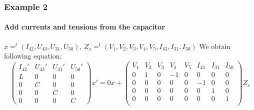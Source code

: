  
\subsubsection{Example 2}
\begin{figure}[h]
\centerline{
 \scalebox{0.9}{
    
 }
}
\end{figure}
\paragraph{Add currents and tensions from the capacitor}
$x=^{t}(I_{42},U_{43},U_{31},U_{50})$,
$Z_{s}=^{t}(V_{1},V_{2},V_{3},V_{4},V_{5},I_{43},I_{31},I_{50})$
We obtain following equation:
\[\left(\begin{array}{cccc}
  I_{42}'&U_{43}'&U_{31}'&U_{50}'\\
  \hline
L&0&0&0\\
0&C&0&0\\
0&0&C&0\\
0&0&0&C
\end{array}\right)x'=
0x+
\left(\begin{array}{cccccccc}
  V_{1}&V_{2}&V_{3}&V_{4}&V_{5}&I_{43}&I_{31}&I_{50}\\
  \hline
  0&1&0&-1&0&0&0&0\\
  0&0&0&0&0&-1&0&0\\
  0&0&0&0&0&0&1&0\\
  0&0&0&0&0&0&0&1\\
\end{array}\right)Z_{s}
\]
